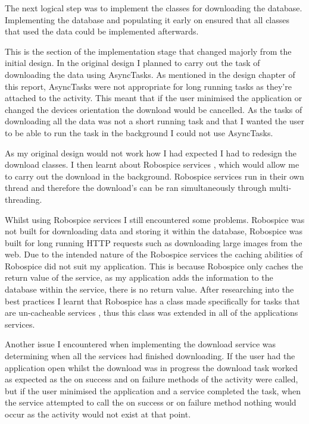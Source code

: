 The next logical step was to implement the classes for downloading the database. Implementing the database and populating it early on ensured that all classes that used the data could be implemented afterwards. 

This is the section of the implementation stage that changed majorly from the initial design. In the original design I planned to carry out the task of downloading the data using AsyncTasks. As mentioned in the design chapter of this report, AsyncTasks were not appropriate for long running tasks \cite{async_task} as they're attached to the activity. This meant that if the user minimised the application or changed the devices orientation the download would be cancelled. As the tasks of downloading all the data was not a short running task and that I wanted the user to be able to run the task in the background I could not use AsyncTasks.

As my original design would not work how I had expected I had to redesign the download classes. I then learnt about Robospice services \cite{robospice}, which would allow me to carry out the download in the background. Robospice services run in their own thread \cite{robospice} and therefore the download's can be ran simultaneously through multi-threading.

Whilst using Robospice services I still encountered some problems. Robospice was not built for downloading data and storing it within the database, Robospice was built for long running HTTP requests \cite{robospice} such as downloading large images from the web. Due to the intended nature of the Robospice services the caching abilities of Robospice did not suit my application. This is because Robospice only caches the return value of the service, as my application adds the information to the database within the service, there is no return value. After researching into the best practices I learnt that Robospice has a class made specifically for tasks that are un-cacheable services \cite{robospice}, thus this class was extended in all of the applications services.

Another issue I encountered when implementing the download service was determining when all the services had finished downloading. If the user had the application open whilst the download was in progress the download task worked as expected as the on success and on failure methods of the activity were called, but if the user minimised the application and a service completed the task, when the service attempted to call the on success or on failure method nothing would occur as the activity would not exist at that point.

